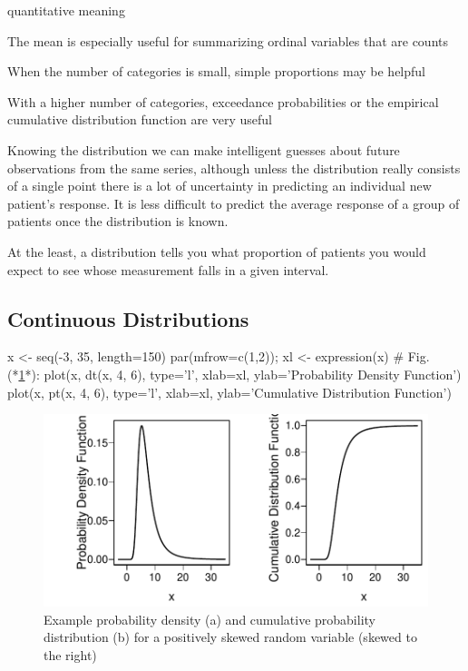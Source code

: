     quantitative meaning
  \item The mean is especially useful for summarizing ordinal
    variables that are counts
  \item When the number of categories is small, simple proportions may
    be helpful
  \item With a higher number of categories, exceedance probabilities
    or the empirical cumulative distribution function are very useful
  \ei
\item Knowing the distribution we can make intelligent guesses about
  future observations from the same series, although unless the
  distribution really 
  consists of a single point there is a lot of uncertainty in
  predicting an individual new patient's response.  It is less
  difficult to predict the average response of a group of patients
  once the distribution is known.  
\item At the least, a distribution tells
  you what proportion of patients you would expect to see whose
  measurement falls in a given interval.
\ei

\subsection{Continuous Distributions}
\begin{Schunk}
\begin{Sinput}
x <- seq(-3, 35, length=150)
par(mfrow=c(1,2)); xl <- expression(x)   # Fig. (*\ref{fig:descript-pdfcdf}*):
plot(x, dt(x, 4, 6), type='l', xlab=xl, ylab='Probability Density Function')
plot(x, pt(x, 4, 6), type='l', xlab=xl, ylab='Cumulative Distribution Function')
\end{Sinput}
\begin{figure}[htbp]

\centerline{\includegraphics[width=\maxwidth]{descript-pdfcdf-1} }

\caption[Density and cumulative distribution functions]{Example probability density (a) and cumulative probability distribution (b) for a positively skewed random variable (skewed to the right)}\label{fig:descript-pdfcdf}
\end{figure}
\end{Schunk}


